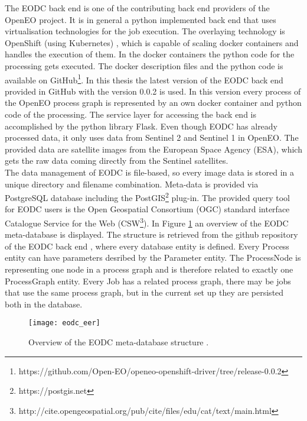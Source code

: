 \documentclass[draft,final]{vutinfth} %
\begin{document}
The EODC back end is one of the contributing back end providers of the OpenEO project. It is in general a python implemented back end that uses virtualisation technologies for the job execution. The overlaying technology is OpenShift (using Kubernetes) \cite{openshift}, which is capable of scaling docker containers and handles the execution of them. In the docker containers the python code for the processing gets executed. The docker description files and the python code is available on GitHub\footnote{https://github.com/Open-EO/openeo-openshift-driver/tree/release-0.0.2}. In this thesis the latest version of the EODC back end provided in GitHub with the version 0.0.2 is used. In this version every process of the OpenEO process graph is represented by an own docker container and python code of the processing. The service layer for accessing the back end is accomplished by the python library Flask. Even though EODC has already processed data, it only uses data from Sentinel 2 and Sentinel 1 in OpenEO. The provided data are satellite images from the European Space Agency (ESA), which gets the raw data coming directly from the Sentinel satellites. \\
The data management of EODC is file-based, so every image data is stored in a unique directory and filename combination. Meta-data is provided via PostgreSQL database including the PostGIS\footnote{https://postgis.net} plug-in. The provided query tool for EODC users is the Open Geospatial Consortium (OGC) standard interface Catalogue Service for the Web (CSW\footnote{http://cite.opengeospatial.org/pub/cite/files/edu/cat/text/main.html}). In Figure \ref{fig:eodceer} an overview of the EODC meta-database is displayed. The structure is retrieved from the github repository of the EODC back end \cite{eodc_github}, where every database entity is defined. Every Process entity can have parameters desribed by the Parameter entity. The ProcessNode is representing one node in a process graph and is therefore related to exactly one ProcessGraph entity. Every Job has a related process graph, there may be jobs that use the same process graph, but in the current set up they are persisted both in the database.

\begin{figure}[h]
	\centering
	\texttt{[image: eodc\_eer]}
	\caption{Overview of the EODC meta-database structure \cite{eodc_github}.}
	\label{fig:eodceer} %
\end{figure}
\end{document}
